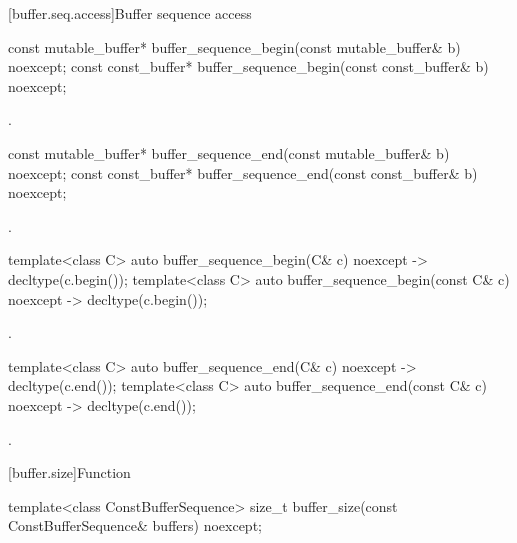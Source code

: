 [buffer.seq.access]{Buffer sequence access}

%
\begin{itemdecl}
const mutable_buffer* buffer_sequence_begin(const mutable_buffer& b) noexcept;
const const_buffer* buffer_sequence_begin(const const_buffer& b) noexcept;
\end{itemdecl}

\begin{itemdescr}
\pnum
\returns {}.
\end{itemdescr}

%
\begin{itemdecl}
const mutable_buffer* buffer_sequence_end(const mutable_buffer& b) noexcept;
const const_buffer* buffer_sequence_end(const const_buffer& b) noexcept;
\end{itemdecl}

\begin{itemdescr}
\pnum
\returns {}.
\end{itemdescr}

%
\begin{itemdecl}
template<class C> auto buffer_sequence_begin(C& c) noexcept -> decltype(c.begin());
template<class C> auto buffer_sequence_begin(const C& c) noexcept -> decltype(c.begin());
\end{itemdecl}

\begin{itemdescr}
\pnum
\returns {}.
\end{itemdescr}

%
\begin{itemdecl}
template<class C> auto buffer_sequence_end(C& c) noexcept -> decltype(c.end());
template<class C> auto buffer_sequence_end(const C& c) noexcept -> decltype(c.end());
\end{itemdecl}

\begin{itemdescr}
\pnum
\returns {}.
\end{itemdescr}



[buffer.size]{Function }

%
\begin{itemdecl}
template<class ConstBufferSequence>
  size_t buffer_size(const ConstBufferSequence& buffers) noexcept;
\end{itemdecl}

